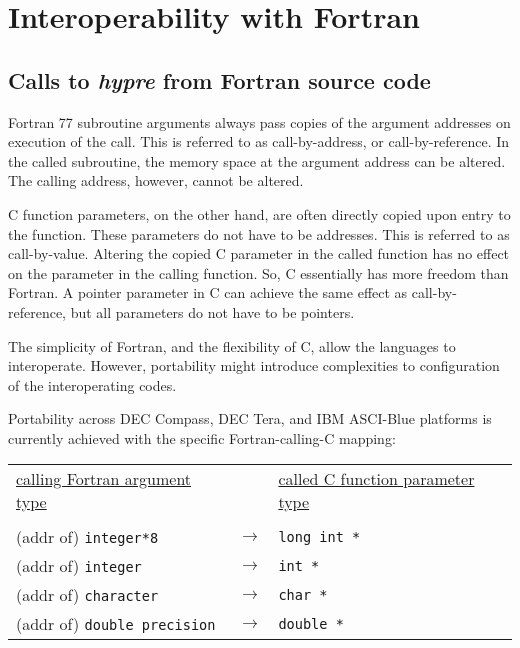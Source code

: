 \chapter{Interoperability with Fortran}

\section{Calls to {\slshape hypre} from Fortran source code}

Fortran 77 subroutine arguments always pass copies of the argument addresses
on execution of the call.  This is referred to as call-by-address, or
call-by-reference.  In the called subroutine, the memory space at the
argument address can be altered.  The calling address, however, cannot be
altered.

C function parameters, on the other hand, are often directly copied upon
entry to the function.  These parameters do not have to be addresses.
This is referred to as call-by-value.  Altering the copied C parameter in the
called function has no effect on the parameter in the calling function.  So,
C essentially has more freedom than Fortran.  A pointer parameter in C can
achieve the same effect as call-by-reference, but all parameters do not have
to be pointers.

The simplicity of Fortran, and the flexibility of C, allow the languages to
interoperate.  However, portability might introduce complexities to
configuration of the interoperating codes.

Portability across DEC Compass, DEC Tera, and IBM ASCI-Blue platforms is
currently achieved with the specific Fortran-calling-C mapping: 

\vspace{0.2in}

\begin{tabular}{lcl}

\underline{calling Fortran argument type} & &
\underline{called C function parameter type} \\
                              &                   &   \\
\hspace{0.1in} (addr of) \verb+integer*8+        & $\longrightarrow$ &
\hspace{0.5in} \verb+long int *+ \\
\hspace{0.1in} (addr of) \verb+integer+          & $\longrightarrow$ &
\hspace{0.5in} \verb+int *+ \\
\hspace{0.1in} (addr of) \verb+character+        & $\longrightarrow$ &
\hspace{0.5in} \verb+char *+ \\
\hspace{0.1in} (addr of) \verb+double precision+ & $\longrightarrow$ &
\hspace{0.5in} \verb+double *+ \\

\end{tabular}


